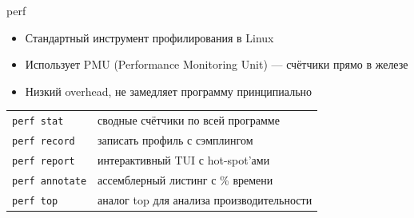 \documentclass[aspectratio=169, russian]{beamer}
\begin{document}
\begin{frame}{perf}
    \begin{itemize}
        \item Стандартный инструмент профилирования в Linux
        \item Использует PMU (Performance Monitoring Unit) --- счётчики прямо в железе
        \item Низкий overhead, не замедляет программу принципиально
    \end{itemize}

    \bigskip
    \begin{center}
        \begin{tabular}{ll}
            \toprule
            \texttt{perf stat}     & сводные счётчики по всей программе        \\
            \texttt{perf record}   & записать профиль с сэмплингом             \\
            \texttt{perf report}   & интерактивный TUI с hot-spot'ами          \\
            \texttt{perf annotate} & ассемблерный листинг с \% времени         \\
            \texttt{perf top}      & аналог top для анализа производительности \\
            \bottomrule
        \end{tabular}
    \end{center}
\end{frame}
\end{document}
